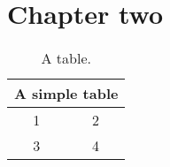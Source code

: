 
\chapter{Chapter two}
\label{ch:one}

\lipsum[41-50]

 \begin{table}[ht]
\centering
\begin{tabular}{cc}
  \toprule
  \multicolumn{2}{c}{A simple table} \\ \midrule
  1 & 2 \\
  3 & 4 \\
  \bottomrule
\end{tabular}
\caption{A table.} 
\end{table}

\lipsum[51]